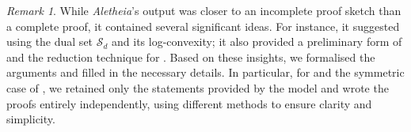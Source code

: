 \documentclass{article}
\numberwithin{equation}{section}
\theoremstyle{plain}
\theoremstyle{definition}
\theoremstyle{remark} %
\newtheorem*{remark}{Remark}
\newcommand{\Aletheia}{\emph{Aletheia}}
\begin{document}
\begin{remark}
    While \Aletheia's output was closer to an incomplete proof sketch than a complete proof, it contained several significant ideas. For instance, it suggested using the dual set $\mathcal{S}_d$ and its log-convexity; it also provided a preliminary form of  and the reduction technique for . Based on these insights, we formalised the arguments and filled in the necessary details. In particular, for  and the symmetric case of , we retained only the statements provided by the model and wrote the proofs entirely independently, using different methods to ensure clarity and simplicity.
\end{remark}

\end{document}
